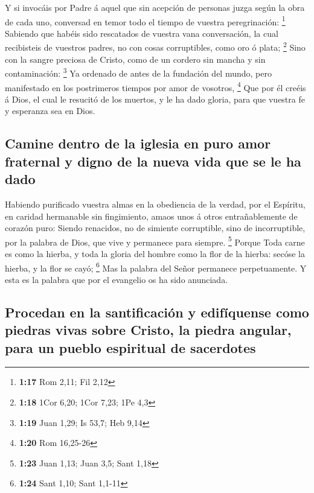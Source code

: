  Y si invocáis por Padre á aquel que sin acepción de
personas juzga según la obra de cada uno, conversad en temor todo el
tiempo de vuestra peregrinación: \footnote{\textbf{1:17} Rom 2,11; Fil
  2,12}  Sabiendo que habéis sido rescatados de vuestra
vana conversación, la cual recibisteis de vuestros padres, no con cosas
corruptibles, como oro ó plata; \footnote{\textbf{1:18} 1Cor 6,20; 1Cor
  7,23; 1Pe 4,3}  Sino con la sangre preciosa de Cristo,
como de un cordero sin mancha y sin contaminación: \footnote{\textbf{1:19}
  Juan 1,29; Is 53,7; Heb 9,14}  Ya ordenado de antes de
la fundación del mundo, pero manifestado en los postrimeros tiempos por
amor de vosotros, \footnote{\textbf{1:20} Rom 16,25-26} 
Que por él creéis á Dios, el cual le resucitó de los muertos, y le ha
dado gloria, para que vuestra fe y esperanza sea en Dios.

\hypertarget{camine-dentro-de-la-iglesia-en-puro-amor-fraternal-y-digno-de-la-nueva-vida-que-se-le-ha-dado}{%
\subsection{Camine dentro de la iglesia en puro amor fraternal y digno
de la nueva vida que se le ha
dado}\label{camine-dentro-de-la-iglesia-en-puro-amor-fraternal-y-digno-de-la-nueva-vida-que-se-le-ha-dado}}

 Habiendo purificado vuestra almas en la obediencia de la
verdad, por el Espíritu, en caridad hermanable sin fingimiento, amaos
unos á otros entrañablemente de corazón puro:  Siendo
renacidos, no de simiente corruptible, sino de incorruptible, por la
palabra de Dios, que vive y permanece para siempre. \footnote{\textbf{1:23}
  Juan 1,13; Juan 3,5; Sant 1,18}  Porque Toda carne es
como la hierba, y toda la gloria del hombre como la flor de la hierba:
secóse la hierba, y la flor se cayó; \footnote{\textbf{1:24} Sant 1,10;
  Sant 1,1-11}  Mas la palabra del Señor permanece
perpetuamente. Y esta es la palabra que por el evangelio os ha sido
anunciada.

\hypertarget{procedan-en-la-santificaciuxf3n-y-edifuxedquense-como-piedras-vivas-sobre-cristo-la-piedra-angular-para-un-pueblo-espiritual-de-sacerdotes}{%
\subsection{Procedan en la santificación y edifíquense como piedras
vivas sobre Cristo, la piedra angular, para un pueblo espiritual de
sacerdotes}\label{procedan-en-la-santificaciuxf3n-y-edifuxedquense-como-piedras-vivas-sobre-cristo-la-piedra-angular-para-un-pueblo-espiritual-de-sacerdotes}}

